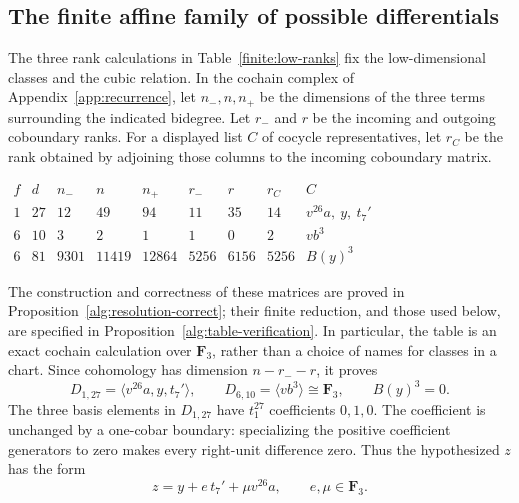 \documentclass[11pt]{article}
\theoremstyle{definition}
\theoremstyle{remark}
\numberwithin{equation}{section}
\begin{document}
\subsection{The finite affine family of possible differentials}

The three rank calculations in Table~\ref{finite:low-ranks} fix the
low-dimensional classes and the cubic relation.  In the cochain complex of
Appendix~\ref{app:recurrence}, let $n_-,n,n_+$ be the dimensions of
the three terms surrounding the indicated bidegree.  Let $r_-$ and
$r$ be the incoming and outgoing coboundary ranks.  For a displayed
list $C$ of cocycle representatives, let $r_C$ be the rank obtained
by adjoining those columns to the incoming coboundary matrix.

\begin{table}[htbp]

\(
\begin{array}{cc|rrr|rr|r|l}
 f&d&n_-&n&n_+&r_-&r&r_C&C\\\hline
 1&27&12&49&94&11&35&14&v^{26}a,\ y,\ t_7'\\
 6&10&3&2&1&1&0&2&vb^3\\
 6&81&9301&11419&12864&5256&6156&5256&B(y)^3
\end{array}
\)
\caption{Cochain ranks identifying the distinguished classes.}
\label{finite:low-ranks}
\end{table}

The construction and correctness of these matrices are proved in
Proposition~\ref{alg:resolution-correct}; their finite reduction, and
those used below, are specified in
Proposition~\ref{alg:table-verification}.  In particular, the table is
an exact cochain calculation over $\mathbf F_3$, rather than a choice of
names for classes in a chart.  Since cohomology has dimension
$n-r_--r$, it proves
\begin{equation}\label{finite:low-classes}
 D_{1,27}=\langle v^{26}a,y,t_7'\rangle,\qquad
 D_{6,10}=\langle vb^3\rangle\cong\mathbf F_3,\qquad B(y)^3=0.
\end{equation}
The three basis elements in $D_{1,27}$ have $t_1^{27}$ coefficients
$0,1,0$.  The coefficient is unchanged by a one-cobar boundary:
specializing the positive coefficient generators to zero makes every
right-unit difference zero.  Thus the hypothesized $z$ has the form
\begin{equation}\label{finite:z-form}
 z=y+e\,t_7'+\mu v^{26}a,\qquad e,\mu\in\mathbf F_3.
\end{equation}
\end{document}
